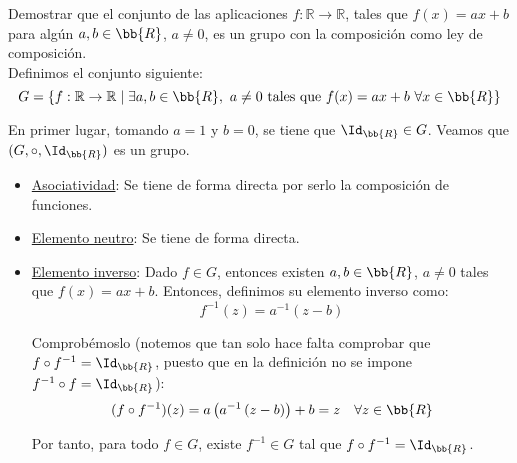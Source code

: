 \begin{ejercicio}\label{ej:2.9}
    Demostrar que el conjunto de las aplicaciones $f : \mathbb{R} \to \mathbb{R}$, tales que $f(x) = ax + b$ para algún $a,b\in \bb{R}$, $a\neq 0$, es un grupo con la composición como ley de composición.\\

    Definimos el conjunto siguiente:
    \begin{equation*}
        G = \{f : \mathbb{R} \to \mathbb{R} \mid \exists a,b\in \bb{R},~a\neq 0 \text{ tales que } f(x) = ax + b\ \forall x\in \bb{R}\}
    \end{equation*}

    En primer lugar, tomando $a=1$ y $b=0$, se tiene que $\Id_{\bb{R}}\in G$. Veamos que $(G,\circ, \Id_{\bb{R}})$ es un grupo.
    \begin{itemize}
        \item \ul{Asociatividad}: Se tiene de forma directa por serlo la composición de funciones.

        \item \ul{Elemento neutro}: Se tiene de forma directa.

        \item \ul{Elemento inverso}: Dado $f\in G$, entonces existen $a,b\in \bb{R}$, $a\neq 0$ tales que $f(x) = ax + b$.
        Entonces, definimos su elemento inverso como:
        \begin{equation*}
            f^{-1}(z) = a^{-1}\left(z - b\right)
        \end{equation*}

        Comprobémoslo (notemos que tan solo hace falta comprobar que $f\circ f^{-1} = \Id_{\bb{R}}$, puesto que en la definición no se impone $f^{-1}\circ f = \Id_{\bb{R}}$):
        \begin{align*}
            (f\circ f^{-1})(z) &= a\left(a^{-1}\left(z - b\right)\right) + b = z& \forall z\in \bb{R}
        \end{align*}

        Por tanto, para todo $f\in G$, existe $f^{-1}\in G$ tal que $f\circ f^{-1}=\Id_{\bb{R}}$.
    \end{itemize}
\end{ejercicio}

